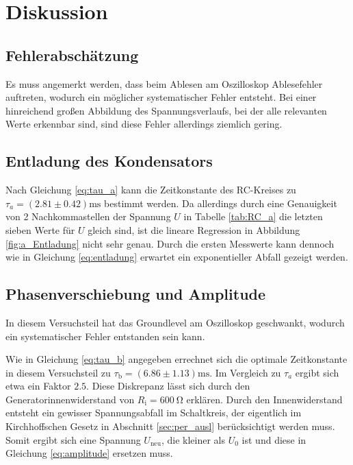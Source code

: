 \section{Diskussion}

\subsection{Fehlerabschätzung}
Es muss angemerkt werden, dass beim Ablesen am Oszilloskop Ablesefehler auftreten, wodurch ein möglicher systematischer Fehler entsteht.
Bei einer hinreichend großen Abbildung des Spannungsverlaufs, bei der alle relevanten Werte erkennbar sind,
sind diese Fehler allerdings ziemlich gering.

\subsection{Entladung des Kondensators}
Nach Gleichung \eqref{eq:tau_a} kann die Zeitkonstante des RC-Kreises zu $\tau_a = (\num{2.81} \pm \num{0.42}) \unit{\milli\second}$
bestimmt werden.
Da allerdings durch eine Genauigkeit von 2 Nachkommastellen der Spannung $U$ in Tabelle \ref{tab:RC_a} die letzten sieben Werte für $U$
gleich sind, ist die lineare Regression in Abbildung \ref{fig:a_Entladung} nicht sehr genau.
Durch die ersten Messwerte kann dennoch wie in Gleichung \eqref{eq:entladung} erwartet ein exponentieller Abfall gezeigt werden.

\subsection{Phasenverschiebung und Amplitude}
In diesem Versuchsteil hat das Groundlevel am Oszilloskop geschwankt, wodurch ein systematischer Fehler entstanden sein kann.

\noindent
Wie in Gleichung \eqref{eq:tau_b} angegeben errechnet sich die optimale Zeitkonstante in diesem Versuchsteil zu 
$\tau_\text{b} = (\num{6.86}\pm \num{1.13})\unit{\milli\s}$.
Im Vergleich zu $\tau_a$ ergibt sich etwa ein Faktor $\num{2.5}$.
Diese Diskrepanz lässt sich durch den Generatorinnenwiderstand von $R_\text{i} = \qty[]{600}{\ohm}$ erklären.
Durch den Innenwiderstand entsteht ein gewisser Spannungsabfall im Schaltkreis, der eigentlich im Kirchhoffschen Gesetz in Abschnitt
\ref{sec:per_ausl} berücksichtigt werden muss. 
Somit ergibt sich eine Spannung $U_\text{neu}$, die kleiner als $U_0$ ist und diese in Gleichung \eqref{eq:amplitude} ersetzen muss.



